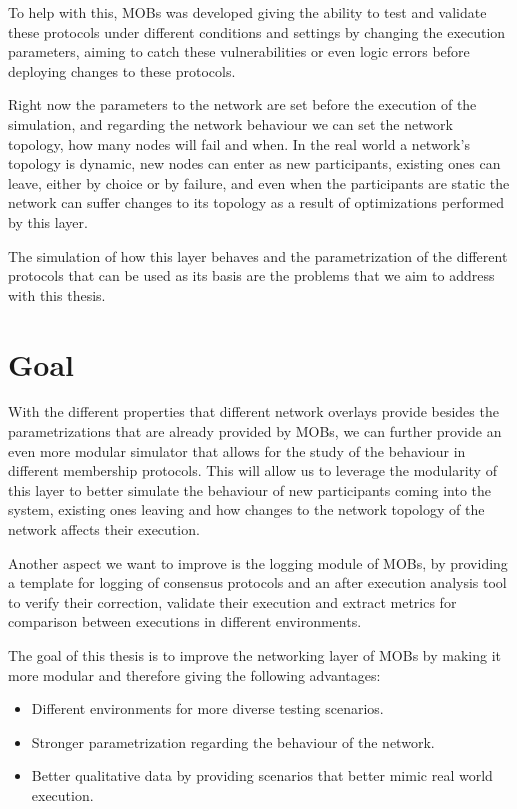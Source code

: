 To help with this, MOBs was developed giving the ability to test and validate these protocols under different conditions and settings by 
changing the execution parameters, aiming to catch these vulnerabilities or even logic errors before deploying changes to these protocols.

Right now the parameters to the network are set before the execution of the simulation, and regarding the network behaviour we can
set the network topology, how many nodes will fail and when. In the real world a network's topology is dynamic, new nodes can enter
as new participants, existing ones can leave, either by choice or by failure, and even when the participants are static the network
can suffer changes to its topology as a result of optimizations performed by this layer.

The simulation of how this layer behaves and the parametrization of the different protocols that can be used as its basis are the
problems that we aim to address with this thesis.


\section{Goal}\label{sub:goal}

With the different properties that different network overlays provide besides the parametrizations that are already provided by MOBs,
we can further provide an even more modular simulator that allows for the study of the behaviour in different membership protocols.
This will allow us to leverage the modularity of this layer to better simulate the behaviour of new participants coming into the system, existing
ones leaving and how changes to the network topology of the network affects their execution.

Another aspect we want to improve is the logging module of MOBs, by providing a template for logging of consensus protocols and
an after execution analysis tool to verify their correction, validate their execution and extract metrics for
comparison between executions in different environments.

The goal of this thesis is to improve the networking layer of MOBs by making it more modular and therefore giving the following advantages:
\begin{itemize}
  \item Different environments for more diverse testing scenarios.
  \item Stronger parametrization regarding the behaviour of the network.
  \item Better qualitative data by providing scenarios that better mimic real world execution.
\end{itemize}

